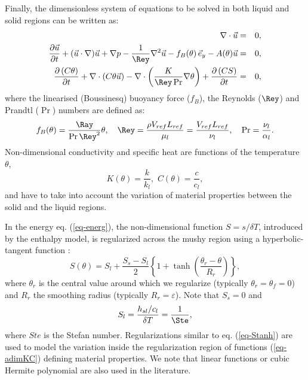 Finally, the dimensionless system of equations to be solved in both liquid and solid regions can be written as:
\begin{eqnarray}
\nabla\cdot \vec{u}&=&0, \label{eq-qmvt} \\ \vspace{0.2cm}
 \frac{\partial \vec{u}}{\partial t} + {(\vec{u}\cdot\nabla) \vec{u}} +\nabla p -\frac{1}{\Rey}{\nabla^2 \vec{u}} 
 - f_B(\theta)\, \vec{e}_y - A(\theta) \vec{u}&=&0, \label{eq-qmvt-2} \\ \vspace{0.2cm}
 \frac{\partial \left(C \theta\right)}{\partial t} + \nabla \cdot\left( C \theta \vec{u}\right) -
 \nabla \cdot\left( \frac{K}{\Rey \Pr} \nabla \theta \right) +  \frac{\partial \left(C S\right)}{\partial t}  &=& 0, \label{eq-energ} 
\end{eqnarray}
where the linearised (Boussinesq) buoyancy force ($f_B$), the Reynolds ($\Rey$) and Prandtl ($\Pr$) numbers are defined as:
\begin{equation}\label{eq-RePr}
f_B(\theta) = \frac{\Ray}{\Pr \Rey^2} \theta, \quad \Rey = \frac{\rho V_{ref} L_{ref}}{\mu_l}=  \frac{V_{ref} L_{ref}}{\nu_l} , \quad \Pr = \frac{\nu_l}{\alpha_l}.
\end{equation}
Non-dimensional conductivity and specific heat are functions of the temperature $\theta$, 
\begin{equation}\label{eq-adimKC}
K(\theta)= \frac{k}{k_l} , \,  \, C(\theta) = \frac{c}{c_l},
\end{equation}
and have to take into account the variation of material properties between the solid and the liquid regions. 

In the energy eq. (\ref{eq-energ}), the non-dimensional function $S = s/\delta T$, introduced by the enthalpy model, is regularized across the mushy region using a hyperbolic-tangent function \citep{dan-2014-JCP}:
\begin{equation}
S(\theta) = S_{l} + \frac{S_{s}-S_{l}}{2}\left\{
1 + \tanh\left(\frac{\theta_r-\theta}{R_r}\right)
\right\},
\label{eq-Stanh}
\end{equation} 
where $\theta_r$ is the central value around which we regularize (typically $\theta_r=\theta_f=0$) and $R_r$ the smoothing radius (typically $R_r=\varepsilon$). Note that $S_{s} = 0$ and
\begin{equation}
S_{l} = \frac{h_{sl}/c_l}{\delta T} = \frac{1}{\Ste},
\label{eq-Ste}
\end{equation} 
where $Ste$ is the Stefan number. Regularizations similar to eq. (\ref{eq-Stanh}) are used to model the variation inside the regularization region of functions (\ref{eq-adimKC}) defining material properties.
We note that linear functions \citep{voller1987pcm,wang2010numerical} or cubic Hermite polynomial \citep{Belhamadia2012} are also used in the literature.

